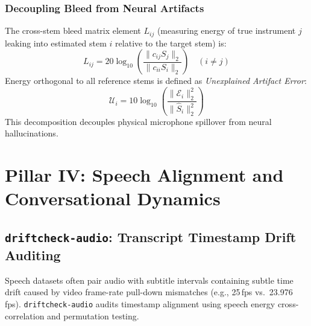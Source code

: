 \documentclass[10pt,journal,compsoc]{IEEEtran}
\begin{document}
\subsubsection{Decoupling Bleed from Neural Artifacts}
The cross-stem bleed matrix element $L_{ij}$ (measuring energy of true instrument $j$ leaking into estimated stem $i$ relative to the target stem) is:
\begin{equation}
L_{ij} = 20 \log_{10} \left( \frac{\|c_{ij} S_j\|_2}{\|c_{ii} S_i\|_2} \right) \quad (i \ne j)
\label{eq:bleed_matrix}
\end{equation}
Energy orthogonal to all reference stems is defined as \emph{Unexplained Artifact Error}:
\begin{equation}
\mathcal{U}_i = 10 \log_{10} \left( \frac{\|\mathcal{E}_i\|_2^2}{\|\hat{S}_i\|_2^2} \right)
\label{eq:artifact_err}
\end{equation}
This decomposition decouples physical microphone spillover from neural hallucinations.

\section{Pillar IV: Speech Alignment and Conversational Dynamics}

\subsection{\texttt{driftcheck-audio}: Transcript Timestamp Drift Auditing}
Speech datasets often pair audio with subtitle intervals containing subtle time drift caused by video frame-rate pull-down mismatches (e.g., 25\,fps vs.\ 23.976\,fps). \texttt{driftcheck-audio} audits timestamp alignment using speech energy cross-correlation and permutation testing.
\end{document}
